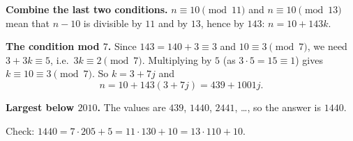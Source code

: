 \textbf{Combine the last two conditions.} $n\equiv10\pmod{11}$ and $n\equiv10\pmod{13}$ mean that $n-10$ is divisible by $11$ and by $13$, hence by $143$: $n=10+143k$.

\textbf{The condition mod $7$.} Since $143=140+3\equiv3$ and $10\equiv3\pmod7$, we need $3+3k\equiv5$, i.e.\ $3k\equiv2\pmod7$. Multiplying by $5$ (as $3\cdot5=15\equiv1$) gives $k\equiv10\equiv3\pmod7$. So $k=3+7j$ and
\[
n=10+143(3+7j)=439+1001j .
\]

\textbf{Largest below $2010$.} The values are $439$, $1440$, $2441$, \dots, so the answer is $\boxed{1440}$.

Check: $1440=7\cdot205+5=11\cdot130+10=13\cdot110+10$.

